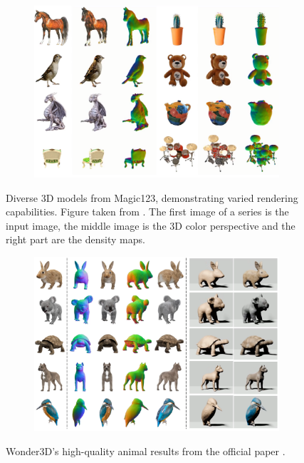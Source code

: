 \begin{figure}[ht]
    \centering
    \small
    \begin{subfigure}[b]{0.9\textwidth}
        \centering
        \includegraphics[width=\textwidth]{etc/Original/magic123_examples.PNG}
        \caption{}
    \end{subfigure}
    \caption{Diverse 3D models from Magic123, demonstrating varied rendering capabilities. Figure taken from \citep{qian2023magic123}. The first image of a series is the input image, the middle image is the 3D color perspective and the right part are the density maps.}\label{fig:magic123Original}
\end{figure}


\begin{figure}[ht]
    \centering
    \small
    \begin{subfigure}[b]{0.9\textwidth}
        \centering
        \includegraphics[width=\textwidth]{etc/Original/wonder3d_animal_examples.PNG}
        \caption{}
    \end{subfigure}
    \caption{Wonder3D's high-quality animal results from the official paper \citep{long2023wonder3d}.}\label{fig:wonder3dOriginal}
\end{figure}


